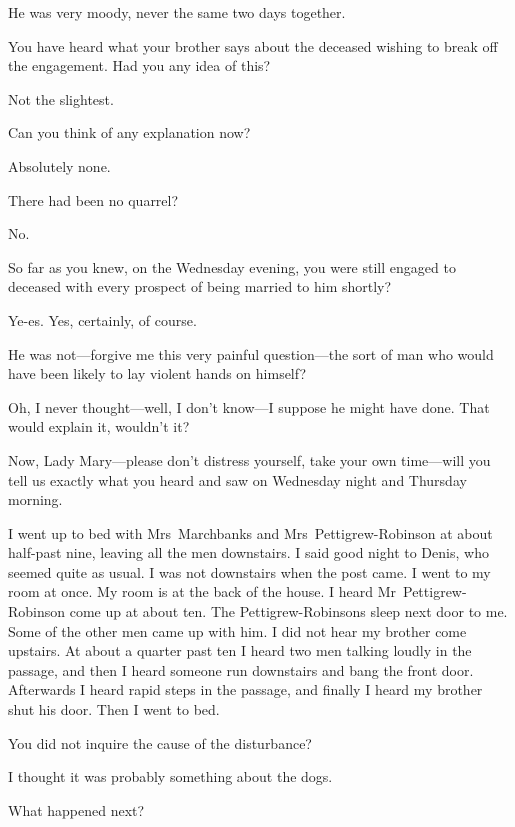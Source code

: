 \begin{dialogue}
 He was very moody, never the same two days together.

 You have heard what your brother says about the deceased wishing to break off the engagement. Had you any idea of this?

 Not the slightest.

 Can you think of any explanation now?

 Absolutely none.

 There had been no quarrel?

 No.

 So far as you knew, on the Wednesday evening, you were still engaged to deceased with every prospect of being married to him shortly?

 Ye-es. Yes, certainly, of course.

 He was not—forgive me this very painful question—the sort of man who would have been likely to lay violent hands on himself?

 Oh, I never thought—well, I don't know—I suppose he might have done. That would explain it, wouldn't it?

 Now, Lady Mary—please don't distress yourself, take your own time—will you tell us exactly what you heard and saw on Wednesday night and Thursday morning.

 I went up to bed with Mrs~Marchbanks and Mrs~Pettigrew-Robinson at about half-past nine, leaving all the men downstairs. I said good night to Denis, who seemed quite as usual. I was not downstairs when the post came. I went to my room at once. My room is at the back of the house. I heard Mr~Pettigrew-Robinson come up at about ten. The Pettigrew-Robinsons sleep next door to me. Some of the other men came up with him. I did not hear my brother come upstairs. At about a quarter past ten I heard two men talking loudly in the passage, and then I heard someone run downstairs and bang the front door. Afterwards I heard rapid steps in the passage, and finally I heard my brother shut his door. Then I went to bed.

 You did not inquire the cause of the disturbance?

  I thought it was probably something about the dogs.

 What happened next?


\end{dialogue}
